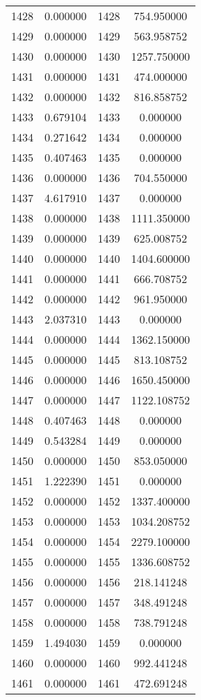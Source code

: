 \documentclass[12pt]{article}
\begin{document}
\begin{longtable}{@{}cccc@{}}
1428 & 0.000000 & 1428 & 754.950000 \\
1429 & 0.000000 & 1429 & 563.958752 \\
1430 & 0.000000 & 1430 & 1257.750000 \\
1431 & 0.000000 & 1431 & 474.000000 \\
1432 & 0.000000 & 1432 & 816.858752 \\
1433 & 0.679104 & 1433 & 0.000000 \\
1434 & 0.271642 & 1434 & 0.000000 \\
1435 & 0.407463 & 1435 & 0.000000 \\
1436 & 0.000000 & 1436 & 704.550000 \\
1437 & 4.617910 & 1437 & 0.000000 \\
1438 & 0.000000 & 1438 & 1111.350000 \\
1439 & 0.000000 & 1439 & 625.008752 \\
1440 & 0.000000 & 1440 & 1404.600000 \\
1441 & 0.000000 & 1441 & 666.708752 \\
1442 & 0.000000 & 1442 & 961.950000 \\
1443 & 2.037310 & 1443 & 0.000000 \\
1444 & 0.000000 & 1444 & 1362.150000 \\
1445 & 0.000000 & 1445 & 813.108752 \\
1446 & 0.000000 & 1446 & 1650.450000 \\
1447 & 0.000000 & 1447 & 1122.108752 \\
1448 & 0.407463 & 1448 & 0.000000 \\
1449 & 0.543284 & 1449 & 0.000000 \\
1450 & 0.000000 & 1450 & 853.050000 \\
1451 & 1.222390 & 1451 & 0.000000 \\
1452 & 0.000000 & 1452 & 1337.400000 \\
1453 & 0.000000 & 1453 & 1034.208752 \\
1454 & 0.000000 & 1454 & 2279.100000 \\
1455 & 0.000000 & 1455 & 1336.608752 \\
1456 & 0.000000 & 1456 & 218.141248 \\
1457 & 0.000000 & 1457 & 348.491248 \\
1458 & 0.000000 & 1458 & 738.791248 \\
1459 & 1.494030 & 1459 & 0.000000 \\
1460 & 0.000000 & 1460 & 992.441248 \\
1461 & 0.000000 & 1461 & 472.691248 \\

\end{longtable}
\end{document}
